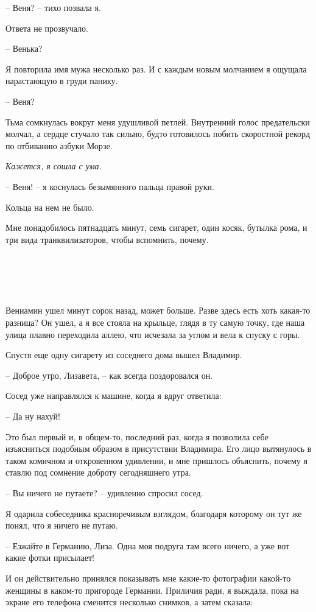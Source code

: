 \documentclass[
]{book}
\begin{document}
-- Веня? -- тихо позвала я.

Ответа не прозвучало.

-- Венька?

Я повторила имя мужа несколько раз. И с каждым новым молчанием я ощущала нарастающую в груди панику.

-- Веня?

Тьма сомкнулась вокруг меня удушливой петлей. Внутренний голос предательски молчал, а сердце стучало так сильно, будто готовилось побить скоростной рекорд по отбиванию азбуки Морзе.

\emph{Кажется, я сошла с ума.}

-- Веня! -- я коснулась безымянного пальца правой руки.

Кольца на нем не было.

Мне понадобилось пятнадцать минут, семь сигарет, один косяк, бутылка рома, и три вида транквилизаторов, чтобы вспомнить, почему.

\hypertarget{chapter-88}{%
\chapter{~}\label{chapter-88}}

Вениамин ушел минут сорок назад, может больше. Разве здесь есть хоть какая-то разница? Он ушел, а я все стояла на крыльце, глядя в ту самую точку, где наша улица плавно переходила аллею, что исчезала за углом и вела к спуску с горы.

Спустя еще одну сигарету из соседнего дома вышел Владимир.

-- Доброе утро, Лизавета, -- как всегда поздоровался он.

Сосед уже направлялся к машине, когда я вдруг ответила:

-- Да ну нахуй!

Это был первый и, в общем-то, последний раз, когда я позволила себе изъясниться подобным образом в присутствии Владимира. Его лицо вытянулось в таком комичном и откровенном удивлении, и мне пришлось объяснить, почему я ставлю под сомнение доброту сегодняшнего утра.

-- Вы ничего не путаете? -- удивленно спросил сосед.

Я одарила собеседника красноречивым взглядом, благодаря которому он тут же понял, что я ничего не путаю.

-- Езжайте в Германию, Лиза. Одна моя подруга там всего ничего, а уже вот какие фотки присылает!

И он действительно принялся показывать мне какие-то фотографии какой-то женщины в каком-то пригороде Германии. Приличия ради, я выждала, пока на экране его телефона сменится несколько снимков, а затем сказала:
\end{document}
